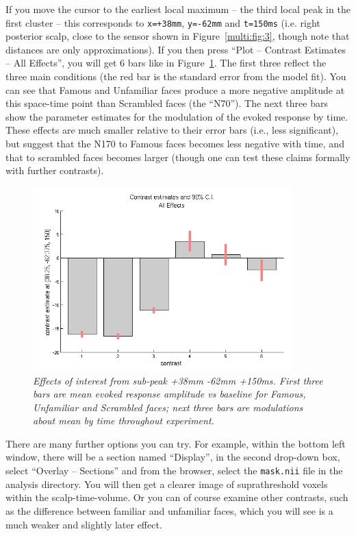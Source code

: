 If you move the cursor to the earliest local maximum -- the third local peak in the first cluster -- this corresponds to \texttt{x=+38mm}, \texttt{y=-62mm} and \texttt{t=150ms} (i.e. right posterior scalp, close to the sensor shown in Figure~\ref{multi:fig:3}, though note that distances are only approximations). If you then press ``Plot -- Contrast Estimates -- All Effects'', you will get 6 bars like in Figure~\ref{multi:fig:7}. The first three reflect the three main conditions (the red bar is the standard error from the model fit). You can see that Famous and Unfamiliar faces produce a more negative amplitude at this space-time point than Scrambled faces (the ``N70''). The next three bars show the parameter estimates for the modulation of the evoked response by time. These effects are much smaller relative to their error bars (i.e., less significant), but suggest that the N170 to Famous faces becomes less negative with time, and that to scrambled faces becomes larger (though one can test these claims formally with further contrasts).

\begin{figure}
\begin{center}
\includegraphics[width=100mm]{multi/figures/figure7}
\caption{\em Effects of interest from sub-peak +38mm -62mm +150ms. First three bars are mean evoked response amplitude vs baseline for Famous, Unfamiliar and Scrambled faces; next three bars are modulations about mean by time throughout experiment. \label{multi:fig:7}}
\end{center}
\end{figure}

There are many further options you can try. For example, within the bottom left window, there will be a section named ``Display'', in the second drop-down box, select ``Overlay -- Sections'' and from the browser, select the \texttt{mask.nii} file in the analysis directory. You will then get a clearer image of suprathreshold voxels within the scalp-time-volume. Or you can of course examine other contrasts, such as the difference between familiar and unfamiliar faces, which you will see is a much weaker and slightly later effect.

